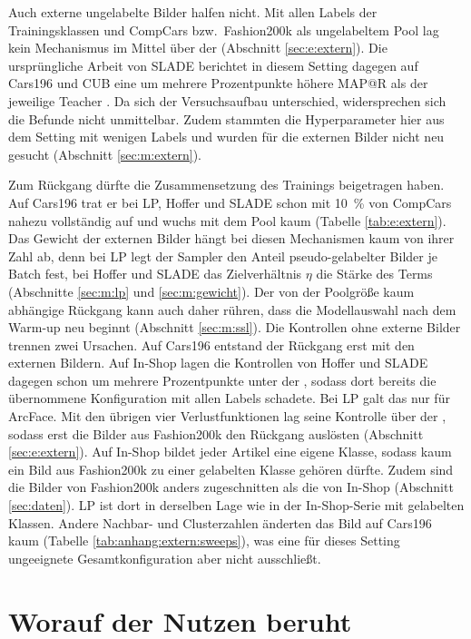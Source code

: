 Auch externe ungelabelte Bilder halfen nicht. Mit allen Labels der Trainingsklassen und CompCars bzw.\ Fashion200k als ungelabeltem Pool lag kein Mechanismus im Mittel über der \UEBL (Abschnitt \ref{sec:e:extern}). Die ursprüngliche Arbeit von \ac{SLADE} berichtet in diesem Setting dagegen auf Cars196 und \ac{CUB} eine um mehrere Prozentpunkte höhere \ac{MAP@R} als der jeweilige Teacher \cite{duan_slade_2021}. Da sich der Versuchsaufbau unterschied, widersprechen sich die Befunde nicht unmittelbar. Zudem stammten die Hyperparameter hier aus dem Setting mit wenigen Labels und wurden für die externen Bilder nicht neu gesucht (Abschnitt \ref{sec:m:extern}).

Zum Rückgang dürfte die Zusammensetzung des Trainings beigetragen haben. Auf Cars196 trat er bei \ac{LP}, Hoffer und \ac{SLADE} schon mit \qty{10}{\percent} von CompCars nahezu vollständig auf und wuchs mit dem Pool kaum (Tabelle \ref{tab:e:extern}). Das Gewicht der externen Bilder hängt bei diesen Mechanismen kaum von ihrer Zahl ab, denn bei \ac{LP} legt der Sampler den Anteil pseudo-gelabelter Bilder je Batch fest, bei Hoffer und \ac{SLADE} das Zielverhältnis $\eta$ die Stärke des Terms (Abschnitte \ref{sec:m:lp} und \ref{sec:m:gewicht}). Der von der Poolgröße kaum abhängige Rückgang kann auch daher rühren, dass die Modellauswahl nach dem Warm-up neu beginnt (Abschnitt \ref{sec:m:ssl}). Die Kontrollen ohne externe Bilder trennen zwei Ursachen. Auf Cars196 entstand der Rückgang erst mit den externen Bildern. Auf In-Shop lagen die Kontrollen von Hoffer und \ac{SLADE} dagegen schon um mehrere Prozentpunkte unter der \UEBL, sodass dort bereits die übernommene Konfiguration mit allen Labels schadete. Bei \ac{LP} galt das nur für ArcFace. Mit den übrigen vier Verlustfunktionen lag seine Kontrolle über der \UEBL, sodass erst die Bilder aus Fashion200k den Rückgang auslösten (Abschnitt \ref{sec:e:extern}). Auf In-Shop bildet jeder Artikel eine eigene Klasse, sodass kaum ein Bild aus Fashion200k zu einer gelabelten Klasse gehören dürfte. Zudem sind die Bilder von Fashion200k anders zugeschnitten als die von In-Shop (Abschnitt \ref{sec:daten}). \ac{LP} ist dort in derselben Lage wie in der In-Shop-Serie mit gelabelten Klassen. Andere Nachbar- und Clusterzahlen änderten das Bild auf Cars196 kaum (Tabelle \ref{tab:anhang:extern:sweeps}), was eine für dieses Setting ungeeignete Gesamtkonfiguration aber nicht ausschließt.

\section{Worauf der Nutzen beruht}
\label{sec:d:ursachen}

